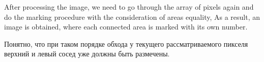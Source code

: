 \documentclass[12pt,a4paper,oneside,titlepage]{article}
\begin{document}














After processing the image, we need to go through the array of pixels again and do the marking procedure with the consideration of areas equality,
As a result, an image is obtained, where each connected area is marked with its own number.

Понятно, что при таком порядке обхода у текущего рассматриваемого пикселя верхний и левый сосед уже должны быть размечены.

\end{document}
